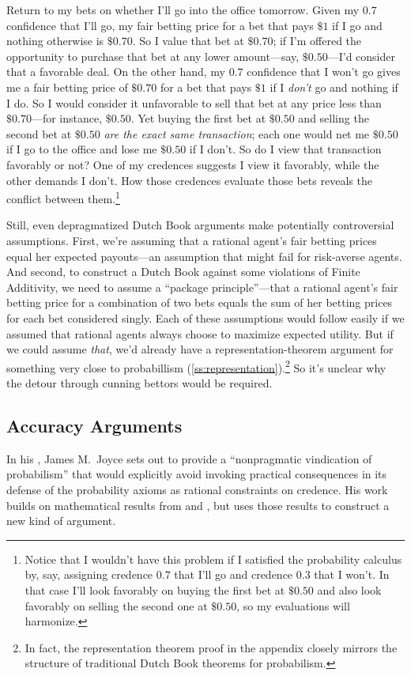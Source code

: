 Return to my bets on whether I'll go into the office tomorrow. Given my $0.7$ confidence that I'll go, my fair betting price for a bet that pays $\$1$ if I go and nothing otherwise is $\$0.70$. So I value that bet at $\$0.70$; if I'm offered the opportunity to purchase that bet at any lower amount---say, $\$0.50$---I'd consider that a favorable deal. On the other hand, my $0.7$ confidence that I won't go gives me a fair betting price of $\$0.70$ for a bet that pays $\$1$ if I \emph{don't} go and nothing if I do. So I would consider it unfavorable to sell that bet at any price less than $\$0.70$---for instance, $\$0.50$. Yet buying the first bet at $\$0.50$ and selling the second bet at $\$0.50$ \emph{are the exact same transaction}; each one would net me $\$0.50$ if I go to the office and lose me $\$0.50$ if I don't. So do I view that transaction favorably or not? One of my credences suggests I view it favorably, while the other demands I don't. How those credences evaluate those bets reveals the conflict between them.\footnote
{Notice that I wouldn't have this problem if I satisfied the probability calculus by, say, assigning credence $0.7$ that I'll go and credence $0.3$ that I won't. In that case I'll look favorably on buying the first bet at $\$0.50$ and also look favorably on selling the second one at $\$0.50$, so my evaluations will harmonize.}

Still, even depragmatized Dutch Book arguments make potentially controversial assumptions. First, we're assuming that a rational agent's fair betting prices equal her expected payouts---an assumption that might fail for risk-averse agents. And second, to construct a Dutch Book against some violations of Finite Additivity, we need to assume a ``package principle''---that a rational agent's fair betting price for a combination of two bets equals the sum of her betting prices for each bet considered singly. Each of these assumptions would follow easily if we assumed that rational agents always choose to maximize expected utility. But if we could assume \emph{that}, we'd already have a representation-theorem argument for something very close to probabillism (\autoref{ss:representation}).\footnote
{In fact, the representation theorem proof in the appendix closely mirrors the structure of traditional Dutch Book theorems for probabilism.} So it's unclear why the detour through cunning bettors would be required.

\subsection{Accuracy Arguments}
In his \citeyear{JoyceNonpragmatic}, James M.\ Joyce sets out to provide a ``nonpragmatic vindication of probabilism'' that would explicitly avoid invoking practical consequences in its defense of the probability axioms as rational constraints on credence. His work builds on mathematical results from \citet{deFinettiTheory} and \citet{RosenkrantzFoundations}, but uses those results to construct a new kind of argument. 

